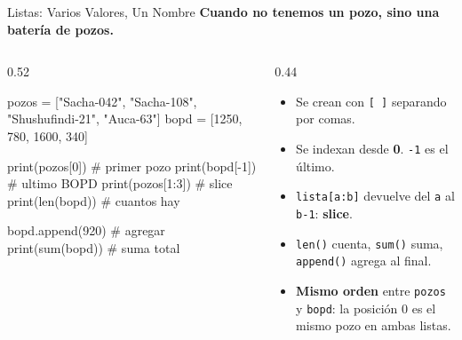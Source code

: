 \documentclass[aspectratio=169, 11pt]{beamer}
\begin{document}
\begin{frame}[fragile,shrink=15]{Listas: Varios Valores, Un Nombre}
  \vspace{-6pt}
  {\small\color{arcaDark}\bfseries
    Cuando no tenemos un pozo, sino una batería de pozos.}

  \vspace{4pt}
  \begin{columns}[T]
    \begin{column}{0.52\textwidth}
      \begin{pyblock}
pozos = ["Sacha-042", "Sacha-108",
         "Shushufindi-21", "Auca-63"]
bopd = [1250, 780, 1600, 340]

print(pozos[0])       # primer pozo
print(bopd[-1])       # ultimo BOPD
print(pozos[1:3])     # slice
print(len(bopd))      # cuantos hay

bopd.append(920)      # agregar
print(sum(bopd))      # suma total
      \end{pyblock}
    \end{column}

    \begin{column}{0.44\textwidth}
      {\scriptsize\color{textMuted}
      \begin{itemize}\setlength{\itemsep}{3pt}
        \item[{\color{arcaRed}\scriptsize\faArrowRight}]
          Se crean con \texttt{[~]} separando por comas.
        \item[{\color{arcaRed}\scriptsize\faArrowRight}]
          Se indexan desde \textbf{0}. \texttt{-1} es el último.
        \item[{\color{arcaRed}\scriptsize\faArrowRight}]
          \texttt{lista[a:b]} devuelve del \texttt{a}
          al \texttt{b-1}: \textbf{slice}.
        \item[{\color{arcaRed}\scriptsize\faArrowRight}]
          \texttt{len()} cuenta, \texttt{sum()} suma,
          \texttt{append()} agrega al final.
        \item[{\color{arcaRed}\scriptsize\faArrowRight}]
          \textbf{Mismo orden} entre \texttt{pozos}
          y \texttt{bopd}: la posición 0 es el
          mismo pozo en ambas listas.
      \end{itemize}
      }
    \end{column}
  \end{columns}
\end{frame}
\end{document}
